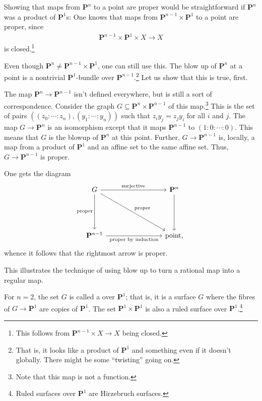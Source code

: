 \documentclass [11 pt, oneside] {article}
\begin{document}
Showing that maps from $\mathbf{P}^n$ to a point are proper would be straightforward if $\mathbf{P}^n$ was a product of $\mathbf{P}^1$s: One knows that maps from $\mathbf{P}^{n-1}\times \mathbf{P}^1$ to a point are proper, since
\begin{align*}
	\mathbf{P}^{n-1} \times \mathbf{P}^1\times X\longrightarrow X
\end{align*}
is closed.\footnote{This follows from $\mathbf{P}^{n-1}\times X\longrightarrow X$ being closed.}

Even though $\mathbf{P}^n\ne \mathbf{P}^{n-1}\times \mathbf{P}^1$, one can still use this. The blow up of $\mathbf{P}^n$ at a point is a nontrivial $\mathbf{P}^1$-bundle over $\mathbf{P}^{n-1}$.\footnote{That is, it looks like a product of $\mathbf{P}^1$ and something even if it doesn't globally. There might be some ``twisting'' going on.} Let us show that this is true, first.

The map $\mathbf{P}^{n}\longrightarrow \mathbf{P}^{n-1}$ isn't defined everywhere, but is still a sort of correspondence. Consider the graph $G\subseteq \mathbf{P}^n\times \mathbf{P}^{n-1}$ of this map.\footnote{Note that this map is not a function.} This is the set of pairs $((z_0:\cdots:z_n), (y_1:\cdots:y_n))$ such that $z_iy_j=z_jy_i$ for all $i$ and $j$. The map $G\longrightarrow \mathbf{P}^n$ is an isomorphism except that it maps $\mathbf{P}^{n-1}$ to $(1:0:\cdots:0)$. This means that $G$ is the blowup of $\mathbf{P}^n$ at this point. Further, $G\longrightarrow \mathbf{P}^{n-1}$ is, locally, a map from a product of $\mathbf{P}^1$ and an affine set to the same affine set. Thus, $G\longrightarrow \mathbf{P}^{n-1}$ is proper.

One gets the diagram
\[
\begin{tikzcd}[column sep = 8 em, row sep = 5 em]
	G \ar[r, "\textrm{surjective}" \iffalse twoheadrightarrow\fi] \ar[d,swap,"\textrm{proper}"] \ar[dr, "\textrm{proper}"] & \mathbf{P}^n\ar[d]\\
	\mathbf{P}^{n-1}\ar[r,"\textrm{proper }\\ \textrm{by induction}", swap] &\textrm{point,}
\end{tikzcd}
\]
whence it follows that the rightmost arrow is proper.

\begin{remark}
	This illustrates the technique of using blow up to turn a rational map into a regular map.
\end{remark}

\begin{remark}
	For $n=2$, the set $G$ is called a  over $\mathbf{P}^1$; that is, it is a surface $G$ where the fibres of $G\longrightarrow \mathbf{P}^1$ are copies of $\mathbf{P}^1$. The set $\mathbf{P}^1\times \mathbf{P}^1$ is also a ruled surface over $\mathbf{P}^1$.\footnote{Ruled surfaces over $\mathbf{P}^1$ are Hirzebruch surfaces.}
\end{remark}
\end{document}
